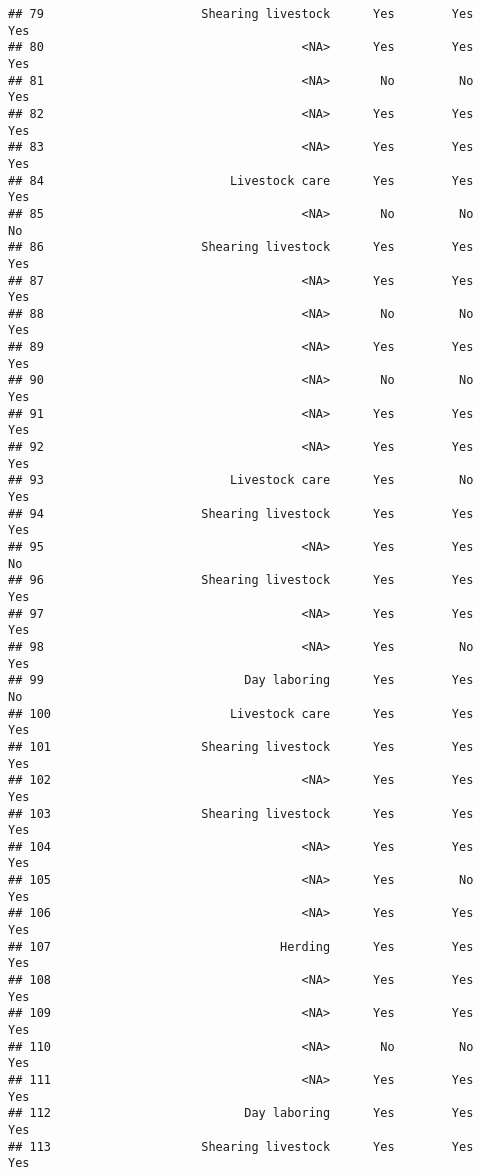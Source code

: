 \documentclass[
]{article}
\begin{document}
\begin{verbatim}
## 79                      Shearing livestock      Yes        Yes      Yes
## 80                                    <NA>      Yes        Yes      Yes
## 81                                    <NA>       No         No      Yes
## 82                                    <NA>      Yes        Yes      Yes
## 83                                    <NA>      Yes        Yes      Yes
## 84                          Livestock care      Yes        Yes      Yes
## 85                                    <NA>       No         No       No
## 86                      Shearing livestock      Yes        Yes      Yes
## 87                                    <NA>      Yes        Yes      Yes
## 88                                    <NA>       No         No      Yes
## 89                                    <NA>      Yes        Yes      Yes
## 90                                    <NA>       No         No      Yes
## 91                                    <NA>      Yes        Yes      Yes
## 92                                    <NA>      Yes        Yes      Yes
## 93                          Livestock care      Yes         No      Yes
## 94                      Shearing livestock      Yes        Yes      Yes
## 95                                    <NA>      Yes        Yes       No
## 96                      Shearing livestock      Yes        Yes      Yes
## 97                                    <NA>      Yes        Yes      Yes
## 98                                    <NA>      Yes         No      Yes
## 99                            Day laboring      Yes        Yes       No
## 100                         Livestock care      Yes        Yes      Yes
## 101                     Shearing livestock      Yes        Yes      Yes
## 102                                   <NA>      Yes        Yes      Yes
## 103                     Shearing livestock      Yes        Yes      Yes
## 104                                   <NA>      Yes        Yes      Yes
## 105                                   <NA>      Yes         No      Yes
## 106                                   <NA>      Yes        Yes      Yes
## 107                                Herding      Yes        Yes      Yes
## 108                                   <NA>      Yes        Yes      Yes
## 109                                   <NA>      Yes        Yes      Yes
## 110                                   <NA>       No         No      Yes
## 111                                   <NA>      Yes        Yes      Yes
## 112                           Day laboring      Yes        Yes      Yes
## 113                     Shearing livestock      Yes        Yes      Yes

\end{verbatim}
\end{document}
